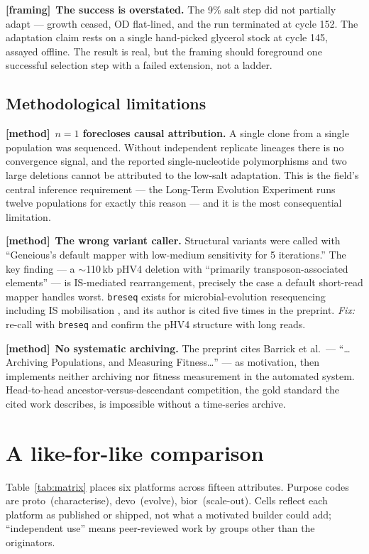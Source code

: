 \documentclass[11pt,a4paper]{article}
\newcommand{\code}[1]{\texttt{\small #1}}
\newcommand{\frm}{\textcolor{warn}{\textbf{[framing]}}}
\newcommand{\mth}{\textcolor{accent}{\textbf{[method]}}}
\begin{document}
\frm\ \textbf{The success is overstated.} The 9\% salt step did not partially adapt --- growth
ceased, OD flat-lined, and the run terminated at cycle 152. The adaptation claim rests on a
single hand-picked glycerol stock at cycle 145, assayed offline. The result is real, but the
framing should foreground one successful selection step with a failed extension, not a ladder.

\subsection{Methodological limitations}

\mth\ \textbf{$n=1$ forecloses causal attribution.} A single clone from a single population was
sequenced. Without independent replicate lineages there is no convergence signal, and the
reported single-nucleotide polymorphisms and two large deletions cannot be attributed to the
low-salt adaptation. This is the field's central inference requirement --- the Long-Term
Evolution Experiment runs twelve populations for exactly this reason
\cite{blount2012cit} --- and it is the most consequential limitation.

\mth\ \textbf{The wrong variant caller.} Structural variants were called with ``Geneious's
default mapper with low-medium sensitivity for 5 iterations.'' The key finding --- a
$\sim$110\,kb pHV4 deletion with ``primarily transposon-associated elements'' --- is
IS-mediated rearrangement, precisely the case a default short-read mapper handles worst.
\code{breseq} exists for microbial-evolution resequencing including IS mobilisation
\cite{deatherage2014breseq}, and its author is cited five times in the preprint. \emph{Fix:}
re-call with \code{breseq} and confirm the pHV4 structure with long reads.

\mth\ \textbf{No systematic archiving.} The preprint cites Barrick et al.\ ---
``\dots Archiving Populations, and Measuring Fitness\dots'' \cite{barrick2023ltee} --- as
motivation, then implements neither archiving nor fitness measurement in the automated system.
Head-to-head ancestor-versus-descendant competition, the gold standard the cited work
describes, is impossible without a time-series archive.

\section{A like-for-like comparison}
\label{sec:matrix}

Table~\ref{tab:matrix} places six platforms across fifteen attributes. Purpose codes are
proto~(characterise), devo~(evolve), bior~(scale-out). Cells reflect each platform as published or
shipped, not what a motivated builder could add; ``independent use'' means peer-reviewed work
by groups other than the originators.
\end{document}
